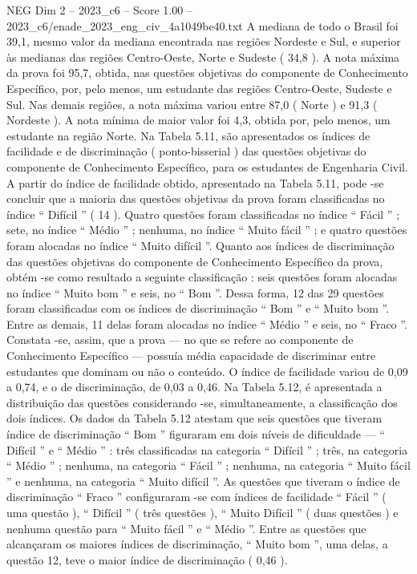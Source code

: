 \begin{textsample}{NEG Dim 2 – 2023\_c6 – Score 1.00 – 2023\_c6/enade\_2023\_eng\_civ\_4a1049be40.txt}
A mediana de todo o Brasil foi 39,1, mesmo valor da mediana encontrada nas regiões Nordeste e Sul, e superior às medianas das regiões Centro-Oeste, Norte e Sudeste ( 34,8 ).
A nota máxima da prova foi 95,7, obtida, nas questões objetivas do componente de Conhecimento Específico, por, pelo menos, um estudante das regiões Centro-Oeste, Sudeste e Sul.
Nas demais regiões, a nota máxima variou entre 87,0 ( Norte ) e 91,3 ( Nordeste ).
A nota mínima de maior valor foi 4,3, obtida por, pelo menos, um estudante na região Norte.
Na Tabela 5.11, são apresentados os índices de facilidade e de discriminação ( ponto-bisserial ) das questões objetivas do componente de Conhecimento Específico, para os estudantes de Engenharia Civil.
A partir do índice de facilidade obtido, apresentado na Tabela 5.11, pode -se concluir que a maioria das questões objetivas da prova foram classificadas no índice “ Difícil ” ( 14 ).
Quatro questões foram classificadas no índice “ Fácil ” ; sete, no índice “ Médio ” ; nenhuma, no índice “ Muito fácil ” ; e quatro questões foram alocadas no índice “ Muito difícil ”.
Quanto aos índices de discriminação das questões objetivas do componente de Conhecimento Específico da prova, obtém -se como resultado a seguinte classificação : seis questões foram alocadas no índice “ Muito bom ” e seis, no “ Bom ”.
Dessa forma, 12 das 29 questões foram classificadas com os índices de discriminação “ Bom ” e “ Muito bom ”.
Entre as demais, 11 delas foram alocadas no índice “ Médio ” e seis, no “ Fraco ”.
Constata -se, assim, que a prova — no que se refere ao componente de Conhecimento Específico — possuía média capacidade de discriminar entre estudantes que dominam ou não o conteúdo.
O índice de facilidade variou de 0,09 a 0,74, e o de discriminação, de 0,03 a 0,46.
Na Tabela 5.12, é apresentada a distribuição das questões considerando -se, simultaneamente, a classificação dos dois índices.
Os dados da Tabela 5.12 atestam que seis questões que tiveram índice de discriminação “ Bom ” figuraram em dois níveis de dificuldade — “ Difícil ” e “ Médio ” : três classificadas na categoria “ Difícil ” ; três, na categoria “ Médio ” ; nenhuma, na categoria “ Fácil ” ; nenhuma, na categoria “ Muito fácil ” e nenhuma, na categoria “ Muito difícil ”.
As questões que tiveram o índice de discriminação “ Fraco ” configuraram -se com índices de facilidade “ Fácil ” ( uma questão ), “ Difícil ” ( três questões ), “ Muito Difícil ” ( duas questões ) e nenhuma questão para “ Muito fácil ” e “ Médio ”.
Entre as questões que alcançaram os maiores índices de discriminação, “ Muito bom ”, uma delas, a questão 12, teve o maior índice de discriminação ( 0,46 ).

\end{textsample}
